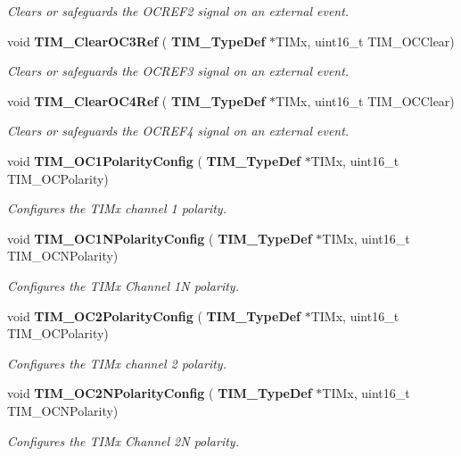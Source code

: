 \begin{DoxyCompactItemize}
\begin{DoxyCompactList}\small\item\em Clears or safeguards the O\+C\+R\+E\+F2 signal on an external event. \end{DoxyCompactList}\item 
void \textbf{ T\+I\+M\+\_\+\+Clear\+O\+C3\+Ref} (\textbf{ T\+I\+M\+\_\+\+Type\+Def} $\ast$T\+I\+Mx, uint16\+\_\+t T\+I\+M\+\_\+\+O\+C\+Clear)
\begin{DoxyCompactList}\small\item\em Clears or safeguards the O\+C\+R\+E\+F3 signal on an external event. \end{DoxyCompactList}\item 
void \textbf{ T\+I\+M\+\_\+\+Clear\+O\+C4\+Ref} (\textbf{ T\+I\+M\+\_\+\+Type\+Def} $\ast$T\+I\+Mx, uint16\+\_\+t T\+I\+M\+\_\+\+O\+C\+Clear)
\begin{DoxyCompactList}\small\item\em Clears or safeguards the O\+C\+R\+E\+F4 signal on an external event. \end{DoxyCompactList}\item 
void \textbf{ T\+I\+M\+\_\+\+O\+C1\+Polarity\+Config} (\textbf{ T\+I\+M\+\_\+\+Type\+Def} $\ast$T\+I\+Mx, uint16\+\_\+t T\+I\+M\+\_\+\+O\+C\+Polarity)
\begin{DoxyCompactList}\small\item\em Configures the T\+I\+Mx channel 1 polarity. \end{DoxyCompactList}\item 
void \textbf{ T\+I\+M\+\_\+\+O\+C1\+N\+Polarity\+Config} (\textbf{ T\+I\+M\+\_\+\+Type\+Def} $\ast$T\+I\+Mx, uint16\+\_\+t T\+I\+M\+\_\+\+O\+C\+N\+Polarity)
\begin{DoxyCompactList}\small\item\em Configures the T\+I\+Mx Channel 1N polarity. \end{DoxyCompactList}\item 
void \textbf{ T\+I\+M\+\_\+\+O\+C2\+Polarity\+Config} (\textbf{ T\+I\+M\+\_\+\+Type\+Def} $\ast$T\+I\+Mx, uint16\+\_\+t T\+I\+M\+\_\+\+O\+C\+Polarity)
\begin{DoxyCompactList}\small\item\em Configures the T\+I\+Mx channel 2 polarity. \end{DoxyCompactList}\item 
void \textbf{ T\+I\+M\+\_\+\+O\+C2\+N\+Polarity\+Config} (\textbf{ T\+I\+M\+\_\+\+Type\+Def} $\ast$T\+I\+Mx, uint16\+\_\+t T\+I\+M\+\_\+\+O\+C\+N\+Polarity)
\begin{DoxyCompactList}\small\item\em Configures the T\+I\+Mx Channel 2N polarity. \end{DoxyCompactList}\item 

\end{DoxyCompactItemize}
